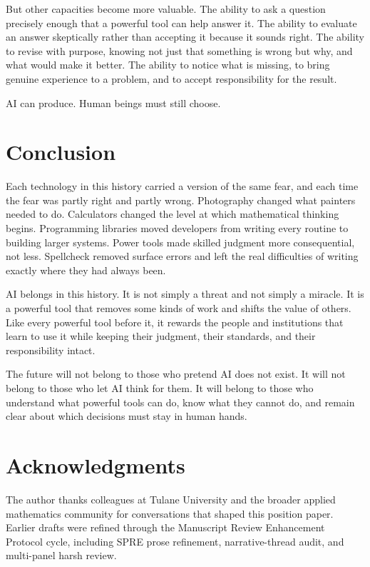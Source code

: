\documentclass[12pt]{article}
\begin{document}
But other capacities become more valuable. The ability to ask a question precisely enough that a powerful tool can help answer it. The ability to evaluate an answer skeptically rather than accepting it because it sounds right. The ability to revise with purpose, knowing not just that something is wrong but why, and what would make it better. The ability to notice what is missing, to bring genuine experience to a problem, and to accept responsibility for the result.

AI can produce. Human beings must still choose.

\section{Conclusion}

Each technology in this history carried a version of the same fear, and each time the fear was partly right and partly wrong. Photography changed what painters needed to do. Calculators changed the level at which mathematical thinking begins. Programming libraries moved developers from writing every routine to building larger systems. Power tools made skilled judgment more consequential, not less. Spellcheck removed surface errors and left the real difficulties of writing exactly where they had always been.

AI belongs in this history. It is not simply a threat and not simply a miracle. It is a powerful tool that removes some kinds of work and shifts the value of others. Like every powerful tool before it, it rewards the people and institutions that learn to use it while keeping their judgment, their standards, and their responsibility intact.

The future will not belong to those who pretend AI does not exist. It will not belong to those who let AI think for them. It will belong to those who understand what powerful tools can do, know what they cannot do, and remain clear about which decisions must stay in human hands.

\section*{Acknowledgments}

The author thanks colleagues at Tulane University and the broader applied mathematics community for conversations that shaped this position paper. Earlier drafts were refined through the Manuscript Review Enhancement Protocol cycle, including SPRE prose refinement, narrative-thread audit, and multi-panel harsh review.


\end{document}
